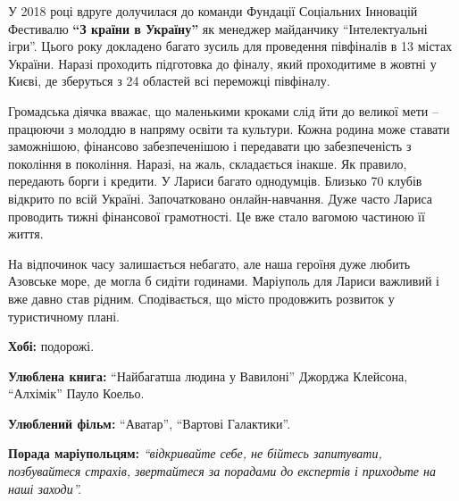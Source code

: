 
У 2018 році вдруге долучилася до команди Фундації Соціальних Інновацій
Фестивалю \textbf{\enquote{З країни в Україну}} як менеджер майданчику
\enquote{Інтелектуальні ігри}.  Цього року докладено багато зусиль для
проведення півфіналів в 13 містах України. Наразі проходить підготовка до
фіналу, який проходитиме в жовтні у Києві, де зберуться з 24 областей всі
переможці півфіналу.

Громадська діячка вважає, що маленькими кроками слід йти до великої мети –
працюючи з молоддю в напряму освіти та культури. Кожна родина може ставати
заможнішою, фінансово забезпеченішою і передавати цю забезпеченість з покоління
в покоління. Наразі, на жаль, складається інакше. Як правило, передають борги і
кредити. У Лариси багато однодумців. Близько 70 клубів відкрито по всій
Україні. Започатковано онлайн-навчання. Дуже часто Лариса проводить тижні
фінансової грамотності. Це вже стало вагомою частиною її життя.

На відпочинок часу залишається небагато, але наша героїня дуже любить Азовське
море, де могла б сидіти годинами. Маріуполь для Лариси важливий і вже давно
став рідним. Сподівається, що місто продовжить розвиток у туристичному плані.

\textbf{Хобі:} подорожі.

\textbf{Улюблена книга:} \enquote{Найбагатша людина у Вавилоні} Джорджа Клейсона, \enquote{Алхімік} Пауло Коельо.

\textbf{Улюблений фільм:} \enquote{Аватар}, \enquote{Вартові Галактики}.

\textbf{Порада маріупольцям:} \emph{\enquote{відкривайте себе, не бійтесь запитувати, позбувайтеся страхів, звертайтеся за порадами до експертів і приходьте на наші заходи}.}

